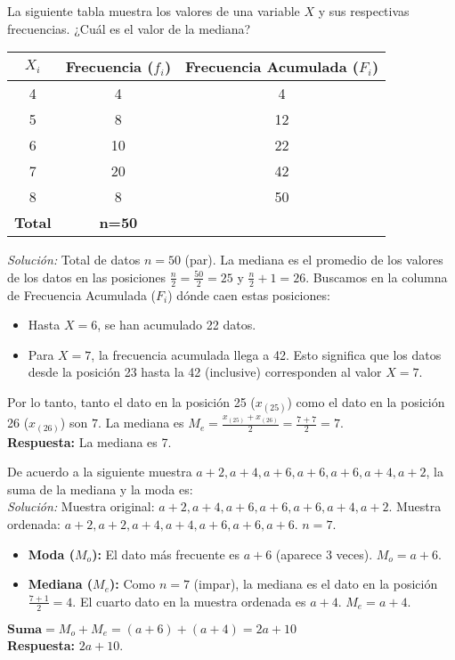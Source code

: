 \documentclass[12pt, letterpaper]{article}
\begin{document}
\vspace{1em} %
\noindent La siguiente tabla muestra los valores de una variable \(X\) y sus respectivas frecuencias. ¿Cuál es el valor de la mediana?
\begin{center}
    \begin{tabular}{|c|c|c|}
        \hline
        \textbf{\(X_i\)} & \textbf{Frecuencia ($f_i$)} & \textbf{Frecuencia Acumulada ($F_i$)} \\
        \hline
        4 & 4 & 4 \\
        \hline
        5 & 8 & 12 \\
        \hline
        6 & 10 & 22 \\
        \hline
        7 & 20 & 42 \\
        \hline
        8 & 8 & 50 \\
        \hline
        \textbf{Total} & \textbf{n=50} & \\
        \hline
    \end{tabular}
\end{center}
\textit{Solución:}
Total de datos $n=50$ (par). La mediana es el promedio de los valores de los datos en las posiciones $\frac{n}{2} = \frac{50}{2}=25$ y $\frac{n}{2}+1 = 26$.
Buscamos en la columna de Frecuencia Acumulada ($F_i$) dónde caen estas posiciones:
\begin{itemize}
    \item Hasta $X=6$, se han acumulado 22 datos.
    \item Para $X=7$, la frecuencia acumulada llega a 42. Esto significa que los datos desde la posición 23 hasta la 42 (inclusive) corresponden al valor $X=7$.
\end{itemize}
Por lo tanto, tanto el dato en la posición 25 ($x_{(25)}$) como el dato en la posición 26 ($x_{(26)}$) son $7$.
La mediana es $M_e = \frac{x_{(25)} + x_{(26)}}{2} = \frac{7+7}{2} = 7$. \\
\textbf{Respuesta:} La mediana es 7.

\vspace{1em}
\noindent De acuerdo a la siguiente muestra \(a+2, a+4, a+6, a+6, a+6, a+4, a+2\), la suma de la mediana y la moda es: \\
\textit{Solución:}
Muestra original: \(a+2, a+4, a+6, a+6, a+6, a+4, a+2\).
Muestra ordenada: \(a+2, a+2, a+4, a+4, a+6, a+6, a+6\). $n=7$.
\begin{itemize}
    \item \textbf{Moda ($M_o$):} El dato más frecuente es \(a+6\) (aparece 3 veces). $M_o = a+6$.
    \item \textbf{Mediana ($M_e$):} Como $n=7$ (impar), la mediana es el dato en la posición $\frac{7+1}{2}=4$. El cuarto dato en la muestra ordenada es \(a+4\). $M_e = a+4$.
\end{itemize}
\(\textbf{Suma} = M_o + M_e = (a+6) + (a+4) = 2a+10\)\\
\textbf{Respuesta:} $2a+10$.
\end{document}
